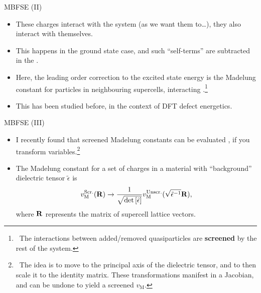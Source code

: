 \documentclass[12pt, pdf, hyperref={draft}, usenames, dvipsnames,
aspectratio=169]{beamer}
\newcommand{\red}[1]{{\bf\color{LancsRed}{#1}}}
\newcommand{\blue}[1]{{\bf\color{NavyBlue}{#1}}}
\newcommand{\green}[1]{{\bf\color{ForestGreen}{#1}}}
\begin{document}
\begin{frame}{MBFSE (II)}
\begin{itemize}

  \item These charges interact with the system (as we want them to\ldots),
  \red{but} they also interact with themselves.

  \item This happens in the ground state case, and such ``self-terms'' are
  subtracted in the \blue{Madelung constant}.

  \item Here, the leading order correction to the excited state energy is the
  Madelung constant for particles in neighbouring supercells, interacting
  \blue{in the effective medium supplied by the rest of the
  system}.\footnote{\ The interactions between added/removed quasiparticles are
  {\bf screened} by the rest of the system.}

  \item This has been studied before, in the context of DFT defect
  energetics.

\end{itemize}
\end{frame}


\begin{frame}{MBFSE (III)}
\begin{itemize}

  \item I recently found that screened Madelung constants can be
  evaluated \green{as they are in the unscreened case}, if you transform
  variables.\footnote{\ The idea is to move to the principal axis of the
  dielectric tensor, and to then scale it to the identity matrix. These
  transformations manifest in a Jacobian, and can be undone to yield a
  screened $v_{\text{M}}$.}

  \item The Madelung constant for a set of charges in a material with
  ``background'' dielectric tensor $\tilde \epsilon$ is
  \begin{equation}
    v^{\text{Scr.}}_{\text{M}}({\bf R}) \rightarrow
    \dfrac{1}{\sqrt{\det{\left[ \tilde \epsilon \right]}}}
    v^{\text{Unscr.}}_{\text{M}}(\sqrt{\tilde\epsilon^{-1}} {\bf R}),
  \end{equation}
  where ${\bf R}$ represents the matrix of supercell lattice vectors.

\end{itemize}
\end{frame}
\end{document}
